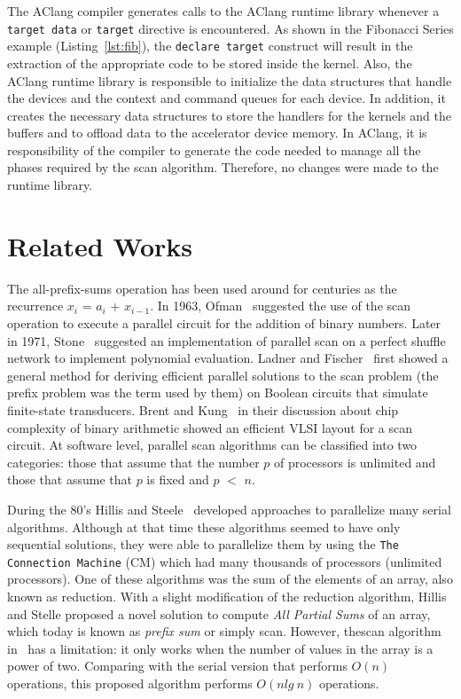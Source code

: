\documentclass[Ingles]{ic-tese-v1}
\newcommand{\ttt}[1]{{\texttt{#1}}}
\newcommand{\tit}[1]{{\textit{#1}}}
\newcommand{\rlst}[1]{Listing~\ref{lst:#1}}
\begin{document}
The AClang compiler generates calls to  the AClang runtime library whenever a
\ttt{target data}  or \ttt{target}  directive is encountered.   As shown  in  the Fibonacci
Series example (\rlst{fib}),  the \ttt{declare  target}
construct will result in the extraction  of the appropriate code to be
stored  inside  the  kernel.  Also,  the  AClang  runtime  library  is
responsible to initialize the data  structures that handle the devices
and the context  and command queues for each device.   In addition, it
creates the  necessary data structures  to store the handlers  for the
kernels and the buffers and to offload data to the accelerator device
memory.  In AClang, it is responsibility of the compiler to generate
the  code needed  to manage  all the  phases required by  the scan  algorithm.
Therefore, no changes were made to the runtime library.

\chapter{Related Works}
\label{cap:RelatedWorks}

The all-prefix-sums operation has been used around for centuries as the recurrence
$x_{i}$ = $a_{i}$ + $x_{i−1}$. In 1963, Ofman~\cite{Ofman:1962} suggested the use of the scan operation to execute a parallel circuit for the addition of binary numbers. Later in 1971, Stone~\cite{Stone:1971} suggested an implementation of parallel scan  on a perfect shuffle network to implement polynomial evaluation. Ladner and Fischer~\cite{Ladner:1980} first showed a general method for deriving efficient parallel solutions to the scan problem (the prefix problem was the term used by them) on Boolean circuits that simulate finite-state transducers. Brent and Kung~\cite{Brent:1981} in their discussion about chip complexity of binary arithmetic showed an efficient VLSI layout for a scan circuit.
At software level, parallel scan algorithms can be classified into two categories: those that assume that the number $p$ of processors is unlimited and those that assume that $p$ is fixed and $p$ $<$ $n$.

During  the 80's  Hillis and  Steele~\cite{dataparallel} developed
approaches to parallelize many serial algorithms. Although at that time
these algorithms  seemed to have only  sequential solutions, they were able to parallelize them by  using the
\ttt{The  Connection Machine}  (CM) \cite{themachine} which had many thousands of processors (unlimited processors). One of these algorithms was the sum of the elements of an  array, also known as  reduction.  With a slight modification of the reduction algorithm, Hillis and Stelle proposed a novel solution to compute \textit{All Partial Sums} of an array, which today  is known  as \tit{prefix sum} or simply scan. However, thescan algorithm in~\cite{dataparallel} has a limitation: it only works when the number of values in the array is a power of two. Comparing with the serial version that performs $O(n)$ operations, this proposed algorithm performs $O(n lg\ n)$ operations.
\end{document}
